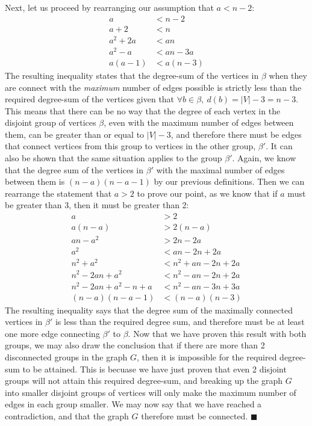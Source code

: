 \documentclass{article}
\begin{document}
\begin{enumerate}
	Next, let us proceed by rearranging our assumption that $a<n-2$:
	\begin{align*}
		a &< n-2 \\
		a+2 &< n \\
		a^2+2a &< an \\
		a^2-a &< an-3a \\
		a(a-1) &< a(n-3)
	\end{align*}
	The resulting inequality states that the degree-sum of the vertices in $\beta$ when they are connect with the \textit{maximum} number of edges possible is strictly less than the required degree-sum of the vertices given that $\forall b \in \beta,\ d(b)=|V|-3=n-3$. This means that there can be no way that the degree of each vertex in the disjoint group of vertices $\beta$, even with the maximum number of edges between them, can be greater than or equal to $|V|-3$, and therefore there must be edges that connect vertices from this group to vertices in the other group, $\beta'$. It can also be shown that the same situation applies to the group $\beta'$. Again, we know that the degree sum of the vertices in $\beta'$ with the maximal number of edges between them is $(n-a)(n-a-1)$ by our previous definitions. Then we can rearrange the statement that $a>2$ to prove our point, as we know that if $a$ must be greater than 3, then it must be greater than 2:
	\begin{align*}
		a &> 2 \\
		a(n-a) &> 2(n-a) \\
		an-a^2 &> 2n-2a \\
		a^2 &< an-2n+2a \\
		n^2 + a^2 &< n^2+an-2n+2a \\
		n^2-2an+a^2 &< n^2-an-2n+2a \\
		n^2-2an+a^2-n+a &< n^2-an-3n+3a \\
		(n-a)(n-a-1) &< (n-a)(n-3)
	\end{align*} 
	The resulting inequality says that the degree sum of the maximally connected vertices in $\beta'$ is less than the required degree sum, and therefore must be at least one more edge connecting $\beta'$ to $\beta$. Now that we have proven this result with both groups, we may also draw the conclusion that if there are more than 2 disconnected groups in the graph $G$, then it is impossible for the required degree-sum to be attained. This is becuase we have just proven that even 2 disjoint groups will not attain this required degree-sum, and breaking up the graph $G$ into smaller disjoint groups of vertices will only make the maximum number of edges in each group smaller. We may now say that we have reached a contradiction, and that the graph $G$ therefore must be connected. \null\hfill $\blacksquare$\\
	

\end{enumerate}
\end{document}
